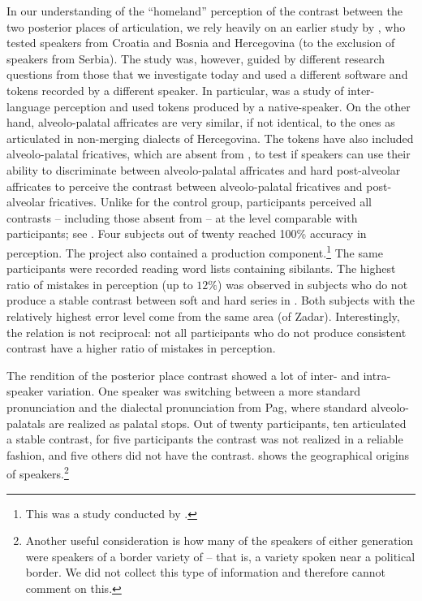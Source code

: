 \documentclass[output=paper,modfonts,newtxmath,hidelinks,]{langscibook}
\begin{document}
In our understanding of the “homeland” perception of the contrast between the two posterior places of articulation, we rely heavily on an earlier study by \citet{Cavar-Hamann2011}, who test{ed} speakers from Croatia and Bosnia and Hercegovina (to the exclusion of speakers from Serbia). The study was, however, guided by different research questions from those that we investigate today and used a different software and tokens recorded by a different speaker. In particular, \citet{Cavar-Hamann2011} was a study of inter-language perception and used tokens produced by a  native-speaker. On the other hand,  alveolo-palatal affricates are very similar, if not identical, to the  ones as articulated in non-merging dialects of Hercegovina. The tokens have also included alveolo-palatal fricatives, which are absent from , to test if  speakers can use their ability to discriminate between alveolo-palatal affricates and hard post-alveolar affricates to perceive the contrast between  alveolo-palatal fricatives and post-alveolar fricatives. Unlike for the  control group,  participants perceived all contrasts – including those absent from  – at the level comparable with  participants; see . Four subjects out of twenty reached 100\% accuracy in perception. The project also contained a production component.\footnote{This was a study conducted by \citet{Cavar-Hamann2008}.} The same  participants were recorded reading word lists containing  sibilants. The highest ratio of mistakes in perception (up to $12\%$) was observed in subjects who do not produce a stable contrast between soft and hard  series in . Both subjects with the relatively highest error level come from the same area (of Zadar). Interestingly, the relation is not reciprocal: not all participants who do not produce consistent contrast have a higher ratio of mistakes in perception.

The rendition of the posterior place contrast showed a lot of inter- and intra-speaker variation. One speaker was switching between a more standard pronunciation and the dialectal pronunciation from Pag, where standard alveolo-palatals are realized as palatal stops. Out of twenty participants, ten articulated a stable contrast, for five participants the contrast was not realized in a reliable fashion, and five others did not have the contrast.  shows the geographical origins of speakers.\footnote{Another useful consideration is how many of the speakers of either generation were speakers of a border variety of  – that is, a variety spoken near a political border. We did not collect this type of information and therefore cannot comment on this.}
\end{document}
